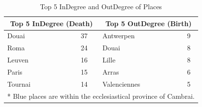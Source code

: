 \documentclass[12pt,a4paper,oneside]{book}
\begin{document}
\begin{sloppypar}
\begin{table}[H]
\centering
\caption{Top 5 InDegree and OutDegree of Places}
\label{tab:top5IndOut}
\begin{tabular}{lclc}
\multicolumn{2}{c|}{\textbf{Top 5 InDegree (Death)}}                                                 & \multicolumn{2}{c}{\textbf{Top 5 OutDegree (Birth)}}                                \\ \hline
\multicolumn{1}{l|}{{\color[HTML]{303498} Douai}}   & \multicolumn{1}{c|}{{\color[HTML]{303498} 37}} & \multicolumn{1}{l|}{Antwerpen}                           & 9                        \\
\multicolumn{1}{l|}{Roma}                           & \multicolumn{1}{c|}{24}                        & \multicolumn{1}{l|}{{\color[HTML]{303498} Douai}}        & {\color[HTML]{303498} 8} \\
\multicolumn{1}{l|}{Leuven}                         & \multicolumn{1}{c|}{16}                        & \multicolumn{1}{l|}{{\color[HTML]{303498} Lille}}        & {\color[HTML]{303498} 8} \\
\multicolumn{1}{l|}{Paris}                          & \multicolumn{1}{c|}{15}                        & \multicolumn{1}{l|}{{\color[HTML]{303498} Arras}}        & {\color[HTML]{303498} 6} \\
\multicolumn{1}{l|}{{\color[HTML]{303498} Tournai}} & \multicolumn{1}{c|}{{\color[HTML]{303498} 14}} & \multicolumn{1}{l|}{{\color[HTML]{303498} Valenciennes}} & {\color[HTML]{303498} 5} \\ \hline
\multicolumn{4}{l}{* {\color[HTML]{303498} Blue places} are within the ecclesiastical province of Cambrai.}                                                                                                       
\end{tabular}
\end{table}


\end{sloppypar}
\end{document}
